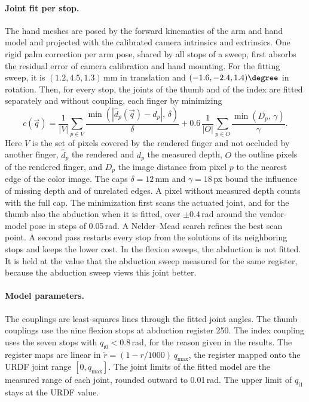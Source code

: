 \paragraph{Joint fit per stop.} The hand meshes are posed by the forward kinematics of the arm and hand model and projected with the calibrated camera intrinsics and extrinsics. One rigid palm correction per arm pose, shared by all stops of a sweep, first absorbs the residual error of camera calibration and hand mounting. For the fitting sweep, it is $(1.2, 4.5, 1.3)$\,mm in translation and $(-1.6,-2.4,1.4)\degree$ in rotation. Then, for every stop, the joints of the thumb and of the index are fitted separately and without coupling, each finger by minimizing
\begin{equation}\label{eq:hand-fit-cost}
    c(\vec{q}) = \frac{1}{|V|}\sum_{p\in V}\frac{\min\left(|\hat{d}_p(\vec{q})-d_p|,\,\delta\right)}{\delta} + 0.6\,\frac{1}{|O|}\sum_{p\in O}\frac{\min\left(D_p,\,\gamma\right)}{\gamma}.
\end{equation}
Here $V$ is the set of pixels covered by the rendered finger and not occluded by another finger, $\hat{d}_p$ the rendered and $d_p$ the measured depth, $O$ the outline pixels of the rendered finger, and $D_p$ the image distance from pixel $p$ to the nearest edge of the color image. The caps $\delta=12$\,mm and $\gamma=18$\,px bound the influence of missing depth and of unrelated edges. A pixel without measured depth counts with the full cap. The minimization first scans the actuated joint, and for the thumb also the abduction when it is fitted, over $\pm0.4$\,rad around the vendor-model pose in steps of 0.05\,rad. A Nelder--Mead search refines the best scan point. A second pass restarts every stop from the solutions of its neighboring stops and keeps the lower cost. In the flexion sweeps, the abduction is not fitted. It is held at the value that the abduction sweep measured for the same register, because the abduction sweep views this joint better.

\paragraph{Model parameters.} The couplings are least-squares lines through the fitted joint angles. The thumb couplings use the nine flexion stops at abduction register 250. The index coupling uses the seven stops with $q_{\mathrm{i}0}<0.8$\,rad, for the reason given in the results. The register maps are linear in $\tilde{r}=(1-r/1000)\,q_{\max}$, the register mapped onto the URDF joint range $[0,q_{\max}]$. The joint limits of the fitted model are the measured range of each joint, rounded outward to 0.01\,rad. The upper limit of $q_{\mathrm{i}1}$ stays at the URDF value.

